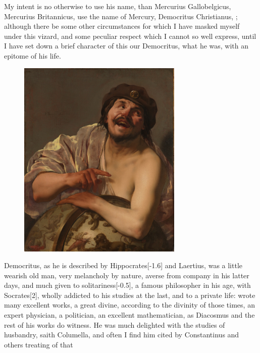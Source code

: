{My intent is no otherwise to use his name, than Mercurius
Gallobelgicus, Mercurius Britannicus, use the name of Mercury,
Democritus Christianus, \etc; although there be some other
circumstances for which I have masked myself under this vizard, and
some peculiar respect which I cannot so well express, until I have set
down a brief character of this our Democritus, what he was, with an
epitome of his life.
\begin{figure}[H]
  \centering
  \includegraphics[keepaspectratio,width=0.7\textwidth]{figures/democritus-small.jpg}
  \caption{}
  \label{fig:democritus}
\end{figure}
Democritus, as he is described by Hippocrates[-1.6\baselineskip] and Laertius, was
a little wearish old man, very melancholy by nature, averse from
company in his latter days, and much given to solitariness[-0.5\baselineskip], a
famous philosopher in his age,  with Socrates[2\baselineskip], wholly
addicted to his studies at the last, and to a private life: wrote many
excellent works, a great divine, according to the divinity of those
times, an expert physician, a politician, an excellent mathematician,
as Diacosmus and the rest of his works do witness. He was much
delighted with the studies of husbandry, saith Columella, and often
I find him cited by Constantinus and others treating of that
}
